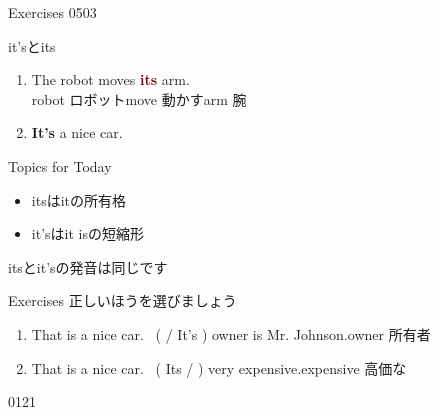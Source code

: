 \documentclass[aspectratio=169,xcolor={dvipsnames,table}]{beamer}
\begin{document}
\begin{frame}[plain]{Exercises}
\hfill{\tiny 0503}\,{\scriptsize {}}
\end{frame}
\begin{frame}[plain]{it'sとits}
\Large
 \begin{enumerate}
  \item The robot moves \textcolor{Maroon}{\bfseries its} arm.\\
\hfill{\scriptsize robot  ロボット\hspace{1\zw}move  動かす\hspace{1\zw}arm  腕}
  \item \textcolor{NavyBlue}{\bfseries It's} a nice car.
 \end{enumerate}
\normalsize

\vfill

\begin{block}{Topics for Today}
 \begin{itemize}[circle]
  \item itsはitの所有格
  \item {it's}は{it is}の短縮形
 \end{itemize}

\hfill{}itsとit'sの発音は同じです \hspace*{1\zw}
     \end{block}

\end{frame}
\begin{frame}[plain]{Exercises}
 正しいほうを選びましょう

 \begin{enumerate}
  \item That is a nice car.\,\,\,\,\,(  / It's ) owner is Mr. Johnson.\hfill{\scriptsize owner  所有者}
  \item That is a nice car.\,\,\,\,\,(  Its /  ) very expensive.\hfill{\scriptsize expensive  高価な}
 \end{enumerate}

\vfill

\hfill{\tiny 0121}\,{\scriptsize {}}
\end{frame}
\end{document}
